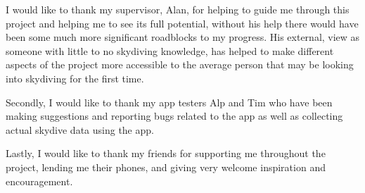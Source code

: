 \begin{acknowledgements}
  I would like to thank my supervisor, Alan, for helping to guide me through this project and helping me to see its full potential, without his help there would have been some much more significant roadblocks to my progress. His external, view as someone with little to no skydiving knowledge, has helped to make different aspects of the project more accessible to the average person that may be looking into skydiving for the first time.

  Secondly, I would like to thank my app testers Alp and Tim who have been making suggestions and reporting bugs related to the app as well as collecting actual skydive data using the app.

  Lastly, I would like to thank my friends for supporting me throughout the project, lending me their phones, and giving very welcome inspiration and encouragement.
\end{acknowledgements}
